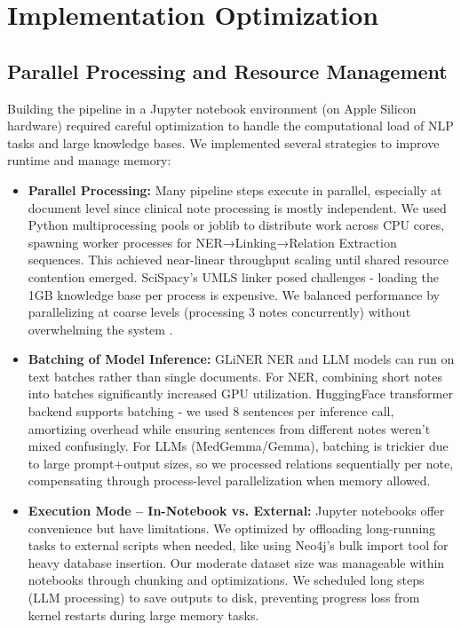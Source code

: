 \section{Implementation Optimization}
\label{sec:optimization}

\subsection{Parallel Processing and Resource Management}

Building the pipeline in a Jupyter notebook environment (on Apple Silicon hardware) required careful optimization to handle the computational load of NLP tasks and large knowledge bases. We implemented several strategies to improve runtime and manage memory:

\begin{itemize}
\item \textbf{Parallel Processing:} Many pipeline steps execute in parallel, especially at document level since clinical note processing is mostly independent. We used Python multiprocessing pools or joblib to distribute work across CPU cores, spawning worker processes for NER→Linking→Relation Extraction sequences. This achieved near-linear throughput scaling until shared resource contention emerged. SciSpacy's UMLS linker posed challenges - loading the 1GB knowledge base per process is expensive. We balanced performance by parallelizing at coarse levels (processing 3 notes concurrently) without overwhelming the system \parencite{McKerns2021}.

\item \textbf{Batching of Model Inference:} GLiNER NER and LLM models can run on text batches rather than single documents. For NER, combining short notes into batches significantly increased GPU utilization. HuggingFace transformer backend supports batching - we used 8 sentences per inference call, amortizing overhead while ensuring sentences from different notes weren't mixed confusingly. For LLMs (MedGemma/Gemma), batching is trickier due to large prompt+output sizes, so we processed relations sequentially per note, compensating through process-level parallelization when memory allowed.

\item \textbf{Execution Mode – In-Notebook vs. External:} Jupyter notebooks offer convenience but have limitations. We optimized by offloading long-running tasks to external scripts when needed, like using Neo4j's bulk import tool for heavy database insertion. Our moderate dataset size was manageable within notebooks through chunking and optimizations. We scheduled long steps (LLM processing) to save outputs to disk, preventing progress loss from kernel restarts during large memory tasks.
\end{itemize}

